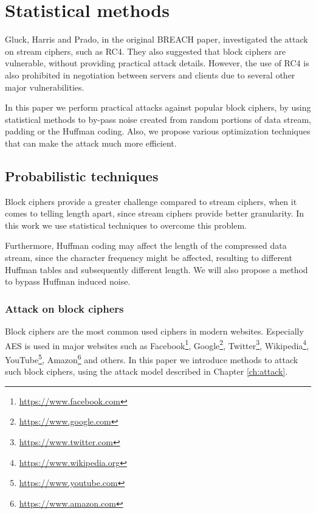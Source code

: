\chapter{Statistical methods}\label{ch:statistic}

Gluck, Harris and Prado, in the original BREACH paper, investigated the attack
on stream ciphers, such as RC4. They also suggested that block ciphers are
vulnerable, without providing practical attack details. However, the use of RC4
is also prohibited in negotiation between servers and clients
\cite{rc4_prohibit} due to several other major vulnerabilities.

In this paper we perform practical attacks against popular block ciphers, by
using statistical methods to by-pass noise created from random portions of data
stream, padding or the Huffman coding. Also, we propose various optimization
techniques that can make the attack much more efficient.

\section{Probabilistic techniques}\label{sec:probabilistic}

Block ciphers provide a greater challenge compared to stream ciphers, when it
comes to telling length apart, since stream ciphers provide better granularity.
In this work we use statistical techniques to overcome this problem.

Furthermore, Huffman coding may affect the length of the compressed data stream,
since the character frequency might be affected, resulting to different Huffman
tables and subsequently different length. We will also propose a method to
bypass Huffman induced noise.

\subsection{Attack on block ciphers}

Block ciphers are the most common used ciphers in modern websites. Especially
AES \cite{aes} is used in major websites such as
Facebook\footnote{\url{https://www.facebook.com}},
Google\footnote{\url{https://www.google.com}},
Twitter\footnote{\url{https://www.twitter.com}},
Wikipedia\footnote{\url{https://www.wikipedia.org}},
YouTube\footnote{\url{https://www.youtube.com}},
Amazon\footnote{\url{https://www.amazon.com}} and others. In this paper we
introduce methods to attack such block ciphers, using the attack model described
in Chapter \ref{ch:attack}.


